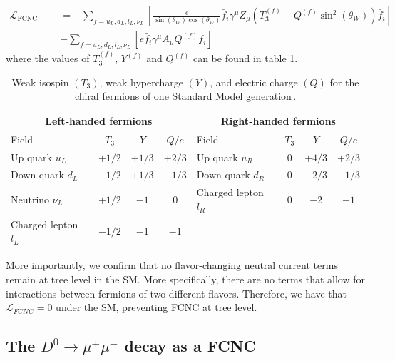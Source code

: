 \begin{equation}
\begin{split}
\mathcal{L}_{\text{FCNC Candidates}} &= -\sum_{f = u_{L},d_{L},l_{L}, \nu_{L}} \left[\frac{e}{\sin(\theta_{W})\cos(\theta_{W})} \bar{f}_{i}\gamma^\mu Z_{\mu}\left(T_{3}^{(f)} -Q^{(f)}\sin^2(\theta_{W})\right)\bar{f}_{i}\right]\\
&- \sum_{f = u_{L},d_{L},l_{L}, \nu_{L}} \left[ e \bar{f}_{i}\gamma^\mu A_{\mu}Q^{(f)}f_{i}\right]
\end{split}
\end{equation}
where the values of $T_3^{(f)}$, $Y^{(f)}$ and $Q^{(f)}$ can be found in table \ref{tab:ew_charges}. 


\begin{table}[htbp]
    \centering
    \begin{tabular}{|lccc|lccc|}
      \hline
      \multicolumn{4}{|c|}{\textbf{Left‑handed fermions}} &
      \multicolumn{4}{c|}{\textbf{Right‑handed fermions}} \\
      \hline
      Field & $T_3$ & $Y$ & $Q/e$ &
      Field & $T_3$ & $Y$ & $Q/e$ \\
      \hline
      Up quark $u_L$        & $+1/2$ & $+1/3$ & $+2/3$ &
      Up quark $u_R$        & $0$    & $+4/3$ & $+2/3$ \\
      Down quark $d_L$      & $-1/2$ & $+1/3$ & $-1/3$ &
      Down quark $d_R$      & $0$    & $-2/3$ & $-1/3$ \\
      Neutrino $\nu_L$      & $+1/2$ & $-1$   & $0$    &
      Charged lepton $l_R$  & $0$    & $-2$   & $-1$   \\
      Charged lepton $l_L$  & $-1/2$ & $-1$   & $-1$   &
                            &        &        &        \\
      \hline
    \end{tabular}
    \caption{Weak isospin $(T_3)$, weak hypercharge $(Y)$, and electric
             charge $(Q)$ for the chiral fermions of one Standard Model
             generation\,\cite{ref:pdg2024}.}
    \label{tab:ew_charges}
  \end{table}
  
  

More importantly, we confirm that no flavor-changing neutral current terms remain at tree level in the SM. More specifically, there are no terms that allow for interactions between fermions of two different flavors. Therefore, we have that $\mathcal{L}_{FCNC} = 0$ under the SM, preventing FCNC at tree level. 

\subsection{The $D^0 \to \mu^+ \mu^-$ decay as a FCNC}


